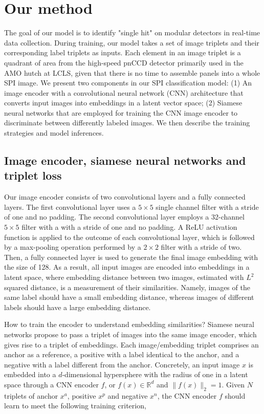 \section{Our method}

The goal of our model is to identify "single hit" on modular detectors in
real-time data collection.  During training, our model takes a set of image
triplets and their corresponding label triplets as inputs.  Each element in an
image triplet is a quadrant of area from the high-speed pnCCD detector primarily
used in the AMO hutch at LCLS, given that there is no time to assemble panels
into a whole SPI image.  We present two components in our SPI classification
model: (1) An image encoder with a convolutional neural network (CNN)
architecture that converts input images into embeddings in a latent vector space;
(2) Siamese neural networks that are employed for training the CNN image encoder
to discriminate between differently labeled images.  We then describe the
training strategies and model inferences.  


\subsection{Image encoder, siamese neural networks and triplet loss}

Our image encoder consists of two convolutional layers and a fully connected
layers.  The first convolutional layer uses a $5 \times 5$ single channel filter
with a stride of one and no padding.  The second convolutional layer employs a
32-channel $5 \times 5$ filter with a with a stride of one and no padding.  A
ReLU activation function is applied to the outcome of each convolutional layer,
which is followed by a max-pooling operation performed by a $2\times 2$ filter
with a stride of two.  Then, a fully connected layer is used to generate the
final image embedding with the size of 128.  As a result, all input images are
encoded into embeddings in a latent space, where embedding distance between two
images, estimated with $L^2$ squared distance, is a measurement of their
similarities.  Namely, images of the same label should have a small embedding
distance, whereas images of different labels should have a large embedding
distance.  


How to train the encoder to understand embedding similarities?  Siamese neural
networks propose to pass a triplet of images into the same image encoder, which
gives rise to a triplet of embeddings.  Each image/embedding triplet comprises
an anchor as a reference, a positive with a label identical to the anchor, and a
negative with a label different from the anchor.  Concretely, an
input image $x$ is embedded into a $d$-dimensional hypersphere with the radius
of one in a latent space through a CNN encoder $f$, or $f(x) \in \mathbb{R}^d$
and $\|f(x)\|_2=1$.  Given $N$ triplets of anchor $x^a$, positive $x^p$ and
negative $x^n$, the CNN encoder $f$ should learn to meet the following training
criterion,

